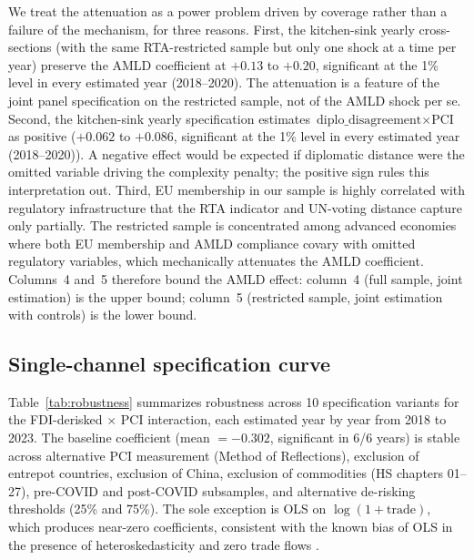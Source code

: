 We treat the attenuation as a power problem driven by coverage rather than a failure of the mechanism, for three reasons. First, the kitchen-sink yearly cross-sections (with the same RTA-restricted sample but only one shock at a time per year) preserve the AMLD coefficient at $+0.13$ to $+0.20$, significant at the 1\% level in every estimated year (2018--2020). The attenuation is a feature of the joint panel specification on the restricted sample, not of the AMLD shock per se. Second, the kitchen-sink yearly specification estimates $\text{diplo\_disagreement} \times \text{PCI}$ as positive ($+0.062$ to $+0.086$, significant at the 1\% level in every estimated year (2018--2020)). A negative effect would be expected if diplomatic distance were the omitted variable driving the complexity penalty; the positive sign rules this interpretation out. Third, EU membership in our sample is highly correlated with regulatory infrastructure that the RTA indicator and UN-voting distance capture only partially. The restricted sample is concentrated among advanced economies where both EU membership and AMLD compliance covary with omitted regulatory variables, which mechanically attenuates the AMLD coefficient. Columns~4 and~5 therefore bound the AMLD effect: column~4 (full sample, joint estimation) is the upper bound; column~5 (restricted sample, joint estimation with controls) is the lower bound.

\subsection{Single-channel specification curve}

Table~\ref{tab:robustness} summarizes robustness across 10 specification variants for the FDI-derisked $\times$ PCI interaction, each estimated year by year from 2018 to 2023. The baseline coefficient (mean $= -0.302$, significant in 6/6 years) is stable across alternative PCI measurement (Method of Reflections), exclusion of entrepot countries, exclusion of China, exclusion of commodities (HS chapters 01--27), pre-COVID and post-COVID subsamples, and alternative de-risking thresholds (25\% and 75\%). The sole exception is OLS on $\log(1 + \text{trade})$, which produces near-zero coefficients, consistent with the known bias of OLS in the presence of heteroskedasticity and zero trade flows \citep{SantosSilva2006_ppml}.

\begin{table}[htbp]
\centering
\caption{Robustness: Specification Summary}
\label{tab:robustness}
\begin{threeparttable}
\small

\begin{tablenotes}
\end{tablenotes}
\end{threeparttable}
\end{table}

